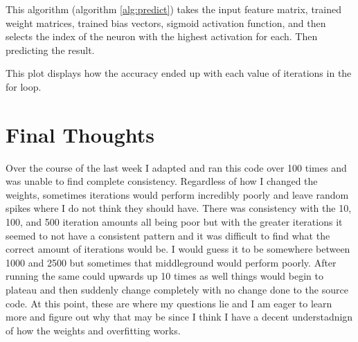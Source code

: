 \documentclass{article}
\begin{document}
This algorithm (algorithm \ref{alg:predict}) takes the input feature matrix, trained weight matrices, trained bias vectors, sigmoid activation function, and then selects the index of the neuron with the highest activation for each. Then predicting the result.


This plot displays how the accuracy ended up with each value of iterations in the for loop. 

\section{Final Thoughts}
Over the course of the last week I adapted and ran this code over 100 times and was unable to find complete consistency. Regardless of how I changed the weights, sometimes iterations would perform incredibly poorly and leave random spikes where I do not think they should have. There was consistency with the 10, 100, and 500 iteration amounts all being poor but with the greater iterations it seemed to not have a consistent pattern and it was difficult to find what the correct amount of iterations would be. I would guess it to be somewhere between 1000 and 2500 but sometimes that middleground would perform poorly. After running the same could upwards up 10 times as well things would begin to plateau and then suddenly change completely with no change done to the source code. At this point, these are where my questions lie and I am eager to learn more and figure out why that may be since I think I have a decent understadnign of how the weights and overfitting works.
\end{document}
